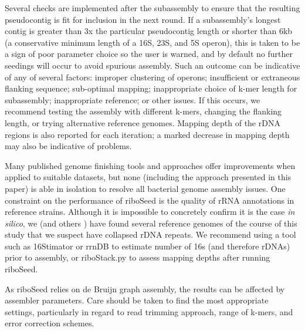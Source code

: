 \documentclass[10pt]{article}
\begin{document}
\begin{linenumbers}

Several checks are implemented after the subassembly to ensure that the resulting pseudocontig is fit for inclusion in the next round. If a subassembly's longest contig is greater than 3x the particular pseudocontig length or shorter than 6kb (a conservative minimum length of a 16S, 23S, and 5S operon), this is taken to be a sign of poor parameter choice so the user is warned, and by default no further seedings will occur to avoid spurious assembly. Such an outcome can be indicative of any of several factors: improper clustering of operons; insufficient or extraneous flanking sequence; sub-optimal mapping; inappropriate choice of k-mer length for subassembly; inappropriate reference; or other issues. If this occurs, we recommend testing the assembly with different k-mers, changing the flanking length, or trying alternative reference genomes. Mapping depth of the rDNA regions is also reported for each iteration; a marked decrease in mapping depth may also be indicative of problems.


Many published genome finishing tools and approaches offer improvements when applied to suitable datasets, but none (including the approach presented in this paper) is able in isolation to resolve all bacterial genome assembly issues. One constraint on the performance of riboSeed is the quality of rRNA annotations in reference strains. Although it is impossible to concretely confirm it is the case \textit{in silico}, we (and others \cite{Mariano2016}) have found several reference genomes of the course of this study that we suspect have collapsed rDNA repeats. We recommend using a tool such as 16Stimator\cite{Perisin2016} or rrnDB\cite{Stoddard2014} to estimate number of 16s (and therefore rDNAs) prior to assembly, or riboStack.py to assess mapping depths after running riboSeed.

As riboSeed relies on de Bruijn graph assembly, the results can be affected by assembler parameters. Care should be taken to find the most appropriate settings, particularly in regard to read trimming approach, range of k-mers, and error correction schemes.


\end{linenumbers}
\end{document}
